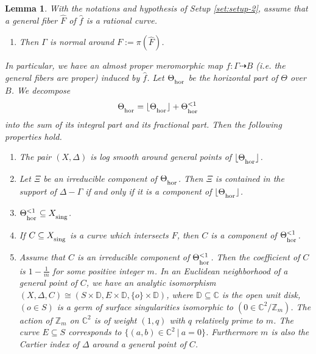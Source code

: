 \documentclass[12pt]{amsart}
\newcommand{\<}{\leq}
\newcommand{\D}{\Delta}
\newtheorem{lemma}[theorem]{Lemma}
\theoremstyle{remark}
\theoremstyle{definition}
\theoremstyle{definition}
\numberwithin{equation}{section}
\theoremstyle{definition}
\theoremstyle{definition}
\def\hor{\operatorname{\hor}}
\def\sing{\operatorname{\textsubscript{\rm sing}}}
\def\hor{\operatorname{\textsubscript{\rm hor}}}
\begin{document}
\begin{lemma} 
\label{lemma:surface-in-Delta-Theta-hor}
With the notations and hypothesis of Setup \ref{set:setup-2}, assume that a general fiber $\widehat{F}$ of $\hat{f}$ is a  rational curve. 
\begin{enumerate}
    \item Then  $\Gamma$ is normal  around $F:= \pi(\widehat{F})$. 
\end{enumerate}
In particular, we have an almost proper meromorphic map $f\colon \Gamma \dashrightarrow B$ (i.e. the general fibers are proper) induced by $\hat{f}$. 
Let $\Theta_{\hor}$ be the horizontal part of $\Theta$ over $B$. 
We decompose  
\[\Theta_{\hor} = \lfloor \Theta_{\hor} \rfloor  + \Theta_{\hor}^{<1}\] 
into the sum of its integral part and its fractional part.  
Then the following properties hold. 
\begin{enumerate}
\item[(2)] The pair $(X,\D)$ is log smooth around general points of $\lfloor \Theta_{\hor} \rfloor$. 
\item[(3)] 
Let $\Xi$ be an  irreducible  component   of $\Theta_{\hor}$. 
Then $\Xi$ is contained in the support of $\D-\Gamma$ if and only if it is a component of $\lfloor \Theta_{\hor} \rfloor$.  
\item[(4)] $\Theta_{\hor}^{<1} \subseteq X_{\sing}$. 
\item[(5)] If $C \subseteq X_{\sing}$ is a curve which intersects $F$, then $C$ is a component of $\Theta_{\hor}^{<1}$. 
\item[(6)]
Assume that $C$ is an irreducible component of $\Theta_{\hor}^{<1}$. 
Then the coefficient of $C$ is $1-\frac{1}{m}$ for some positive integer $m$.
In an Euclidean neighborhood of a general point of  $C$, we have an analytic isomorphism $(X,\Delta, C)\cong (S\times \mathbb{D}, E\times \mathbb{D},  \{o\}\times \mathbb{D})$, 
where $\mathbb{D} \subseteq \mathbb{C}$ is the open unit disk, $(o\in S)$ is a germ of surface singularities isomorphic to $(0\in \mathbb{C}^2/\mathbb{Z}_m)$. 
The action of $\mathbb{Z}_m$ on $\mathbb{C}^2$ is of weight $(1,q)$ with $q$ relatively prime to $m$. 
The curve $E\subseteq S$ corresponds to $\{(a,b)\in \mathbb{C}^2 \ |\ a=0 \}$. 
Furthermore $m$ is also the  Cartier index of $\Delta$ around a general point of $C$.  
\end{enumerate}
\end{lemma}
\end{document}
